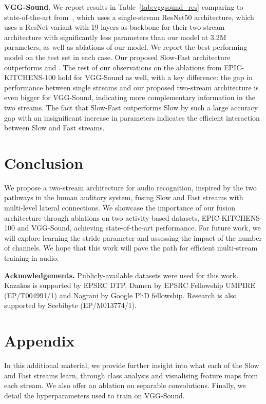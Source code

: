 \documentclass{article}
\begin{document}
\noindent\textbf{VGG-Sound}. We report results in Table~\ref{tab:vggsound_res} comparing to state-of-the-art from~\cite{Chen2019}, which uses a single-stream ResNet50 architecture, \cite{mcdonnell_2020} which uses a ResNet variant with 19 layers as backbone for their two-stream architecture with significantly less parameters than our model at 3.2M parameters, as well as ablations of our model. We report the best performing model on the test set in each case. Our proposed Slow-Fast architecture outperforms \cite{vggsound} and \cite{mcdonnell_2020}. The rest of our observations on the ablations from EPIC-KITCHENS-100 hold for VGG-Sound as well, with a key difference: the gap in performance between single streams and our proposed two-stream architecture is even bigger for VGG-Sound, indicating more complementary information in the two streams. The fact that Slow-Fast outperforms Slow by such a large accuracy gap with an insignificant increase in parameters indicates the efficient interaction between Slow and Fast streams. 

\vspace*{-14pt}
\section{Conclusion}
\label{sec:conclusion}
\vspace*{-4pt}
We propose a two-stream architecture for audio recognition, inspired by the two pathways in the human auditory system, fusing Slow and Fast streams with multi-level lateral connections. We showcase the importance of our fusion architecture through ablations on two activity-based datasets, EPIC-KITCHENS-100 and VGG-Sound, achieving state-of-the-art performance. For future work, we will explore learning the stride parameter and assessing the impact of the number of channels. We hope that this work will pave the path for efficient multi-stream training in audio.

\noindent \textbf{Acknowledgements.} Publicly-available datasets were used for this work. Kazakos is supported by EPSRC DTP, Damen by EPSRC Fellowship UMPIRE (EP/T004991/1) and Nagrani by Google PhD fellowship. Research is also supported by Seebibyte (EP/M013774/1).





\appendix
\section*{Appendix}
In this additional material, we provide further insight into what each of the Slow and Fast streams learn, through class analysis and visualising feature maps from each stream. We also offer an ablation on separable convolutions. Finally, we detail the hyperparameters used to train \cite{mcdonnell_2020} on VGG-Sound. 
\end{document}
